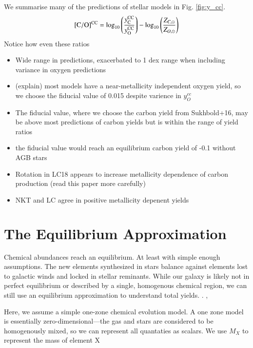 \documentclass[12pt,oneside]{report}
\newcommand{\sun}{\ensuremath{\odot}}
\begin{document}
We summarise many of the predictions of stellar models in Fig. \ref{fig:y_cc}. 
\begin{equation}
    {\rm [C/O]^{CC}} = \log_{10}\left( \frac{y_{\rm C}^{\rm CC}}{y_{\rm O}^{\rm CC}}\right) - \log_{10} \left( \frac{Z_{C, \sun }}{Z_{O, \sun }} \right)
\end{equation}
Notice how even these ratios 



    \begin{itemize}
        \item Wide range in predictions, exacerbated to 1 dex range when including variance in oxygen predictions
        \item (explain) most models have a near-metallicity independent oxygen yield, so we choose the fiducial value of 0.015 despite varience in $y_O^{cc}$
        \item The fiducial value, where we choose the carbon yield from Sukhbold+16, may be above most predictions of carbon yields but is within the range of yield ratios
        \item the fiducial value would reach an equilibrium carbon yield of -0.1 without AGB stars
        \item Rotation in LC18 appears to increase metallicity dependence of carbon production (read this paper more carefully)
        \item NKT and LC agree in positive metallicity depenent yields
    \end{itemize}
    


\chapter{The Equilibrium Approximation}\label{sec:equilibrium}

Chemical abundances reach an equilibrium. At least with simple enough assumptions. The new elements synthesized in stars balance against elements lost to galactic winds and locked in stellar reminants. While our galaxy is likely not in perfect equilibrium or described by a single, homogenous chemical region, we can still use an equilibrium approximation to understand total yields. 
\cite{WAF17}. \cite{james_dwarf}, \cite{james+22}

Here, we assume a simple one-zone chemical evolution model. A one zone model is essentially zero-dimensional---the gas and stars are considered to be homogenously mixed, so we can represent all quantaties as scalars.
We use $M_{X}$ to represent the mass of element X
\end{document}

